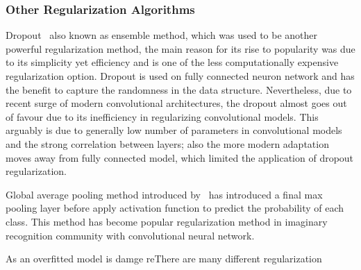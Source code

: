 \subsubsection{Other Regularization Algorithms}

Dropout~\cite{JMLR:v15:srivastava14a} also known as ensemble method, which was used to be another powerful regularization method, the main reason for its rise to popularity was due to its simplicity yet efficiency and is one of the less computationally expensive regularization option. Dropout is used on fully connected neuron network and has the benefit to capture the randomness in the data structure. Nevertheless, due to recent surge of modern convolutional architectures, the dropout almost goes out of favour due to its inefficiency in regularizing convolutional models. This arguably is due to generally low number of parameters in convolutional models and the strong correlation between layers; also the more modern adaptation moves away from fully connected model, which limited the application of dropout regularization. 
\par 
Global average pooling method introduced by~\citet{LinCY13} has introduced a final max pooling layer before apply activation function to predict the probability of each class. This method has become popular regularization method in imaginary recognition community with convolutional neural network. 
\par 
As an overfitted model is damge reThere are many different regularization 